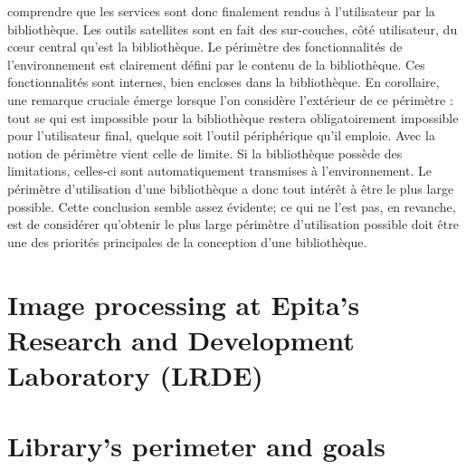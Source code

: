 comprendre que les services sont donc finalement rendus à l'utilisateur par la bibliothèque. Les
outils satellites sont en fait des sur-couches, côté utilisateur, du cœur central qu'est la bibliothèque.
Le périmètre des fonctionnalités de l'environnement est clairement défini par le contenu de la
bibliothèque. Ces fonctionnalités sont internes, bien encloses dans la bibliothèque. En corollaire,
une remarque cruciale émerge lorsque l'on considère l'extérieur de ce périmètre : tout se qui est
impossible pour la bibliothèque restera obligatoirement impossible pour l'utilisateur final, quelque
soit l'outil périphérique qu'il emploie. Avec la notion de périmètre vient celle de limite. Si la
bibliothèque possède des limitations, celles-ci sont automatiquement transmises à l'environnement.
Le périmètre d'utilisation d'une bibliothèque a donc tout intérêt à être le plus large possible. Cette
conclusion semble assez évidente; ce qui ne l'est pas, en revanche, est de considérer qu'obtenir le
plus large périmètre d'utilisation possible doit être une des priorités principales de la conception
d'une bibliothèque.


\chapter{Image processing at Epita's Research and Development Laboratory (LRDE)}

\chapter{Library's perimeter and goals}

